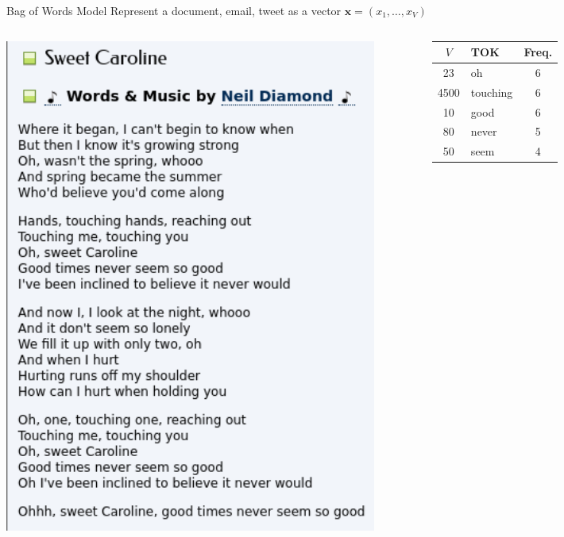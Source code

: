 \documentclass[9pt]{beamer}
\newcommand{\bx}{\mathbf{x}}
\begin{document}
\begin{frame}{Bag of Words Model}
    Represent a document, email, tweet as a vector $\bx=(x_1,\ldots, x_V)$
    \begin{columns}[T]
        \begin{column}{0.6\textwidth}
            \includegraphics[width=0.9\textwidth]{sweet_caroline_lyrics.png}
        \end{column}
        \begin{column}{0.4\textwidth}
            \begin{tabular}{|c|l|c|}
                \hline
                \hline
                $V$ & TOK& Freq. \\
                \hline
                \hline
                23 & oh&6\\
                \hline
                4500 & touching&6\\
                \hline
                10 & good&6\\
                \hline
                80 & never&5\\
                \hline
                50 & seem&4\\

\end{tabular}
\end{column}
\end{columns}
\end{frame}
\end{document}
